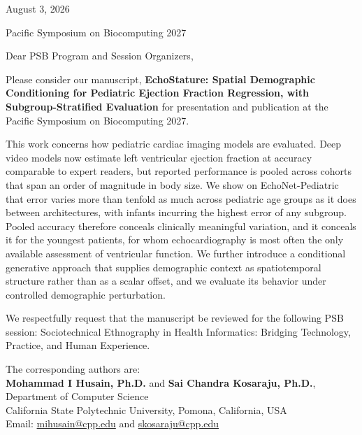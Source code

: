 \documentclass{ws-procs11x85}
\begin{document}
\thispagestyle{empty}

\begin{flushright}
August 3, 2026
\end{flushright}

\vspace{1em}
\noindent Pacific Symposium on Biocomputing 2027

\vspace{1em}
\noindent Dear PSB Program and Session Organizers,

\vspace{1em}
\noindent Please consider our manuscript,
\textbf{EchoStature: Spatial Demographic Conditioning for Pediatric Ejection Fraction Regression, with Subgroup-Stratified Evaluation}
for presentation and publication at the Pacific Symposium on Biocomputing 2027.

\vspace{0.5em}
\noindent  This work concerns how pediatric cardiac imaging models are evaluated. Deep video models now estimate left ventricular ejection fraction at accuracy comparable to expert readers, but reported performance is pooled across cohorts that span an order of magnitude in body size. We show on EchoNet-Pediatric that error varies more than tenfold as much across pediatric age groups as it does between architectures, with infants incurring the highest error of any subgroup. Pooled accuracy therefore conceals clinically meaningful variation, and it conceals it for the youngest patients, for whom echocardiography is most often the only available assessment of ventricular function. We further introduce a conditional generative approach that supplies demographic context as spatiotemporal structure rather than as a scalar offset, and we evaluate its behavior under controlled demographic perturbation.

\vspace{0.5em}
\noindent  We respectfully request that the manuscript be reviewed for the following PSB session:
Sociotechnical Ethnography in Health Informatics: Bridging Technology, Practice, and Human Experience.


\vspace{0.5em}
\noindent The corresponding authors are:\\
\textbf{Mohammad I Husain, Ph.D.} and \textbf{Sai Chandra Kosaraju, Ph.D.},\\
Department of Computer Science\\
California State Polytechnic University, 
Pomona, California, USA\\
Email: \href{mailto:mihusain@cpp.edu}{mihusain@cpp.edu} and \href{mailto:skosaraju@cpp.edu}{skosaraju@cpp.edu}
\end{document}
